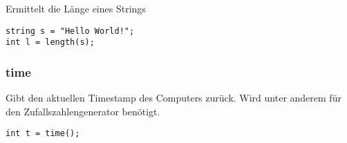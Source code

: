 Ermittelt die L\"ange eines Strings

\begin{lstlisting}[language=CMM]
string s = "Hello World!";
int l = length(s);
\end{lstlisting}

\subsubsection{time}

Gibt den aktuellen Timestamp des Computers zur\"uck. Wird unter anderem f\"ur den Zufallszahlengenerator ben\"otigt.

\begin{lstlisting}[language=CMM]
int t = time();
\end{lstlisting}


